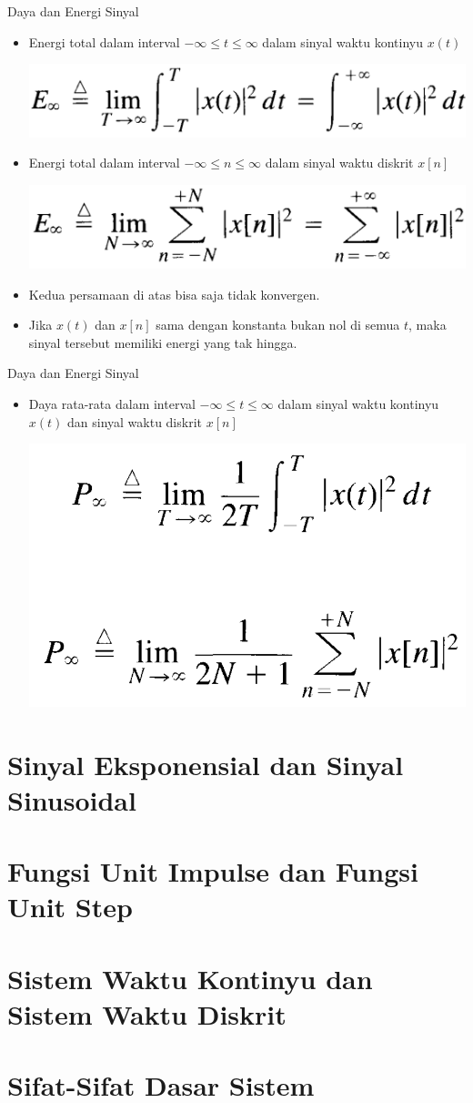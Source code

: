 \documentclass[pdflatex,compress,mathserif]{beamer}
\begin{document}
\begin{frame}{Daya dan Energi Sinyal}
	\begin{itemize}
		\item Energi total dalam interval $ -\infty \leq t \leq \infty $ dalam sinyal waktu kontinyu $ x(t) $
		\begin{center}
			\includegraphics[width=0.5\linewidth]{img/img14}
		\end{center}
		
		\item Energi total dalam interval $ -\infty \leq n \leq \infty $ dalam sinyal waktu diskrit $ x[n] $
		\begin{center}
			\includegraphics[width=0.5\linewidth]{img/img15}
		\end{center}
		
		\item Kedua persamaan di atas bisa saja tidak konvergen.
		\item Jika $ x(t) $ dan $ x[n] $ sama dengan konstanta bukan nol di semua $ t $, maka sinyal tersebut memiliki energi yang tak hingga.
	\end{itemize}
\end{frame}

\begin{frame}{Daya dan Energi Sinyal}
	\begin{itemize}
		\item Daya rata-rata dalam interval $ -\infty \leq t \leq \infty $ dalam sinyal waktu kontinyu $ x(t) $
		dan sinyal waktu diskrit $ x[n] $
		\begin{center}
			\includegraphics[width=0.5\linewidth]{img/img16}
		\end{center}
		
	\end{itemize}
\end{frame}

\section{Sinyal Eksponensial dan Sinyal Sinusoidal}

\section{Fungsi Unit Impulse dan Fungsi Unit Step}

\section{Sistem Waktu Kontinyu dan Sistem Waktu Diskrit}

\section{Sifat-Sifat Dasar Sistem}
\end{document}
